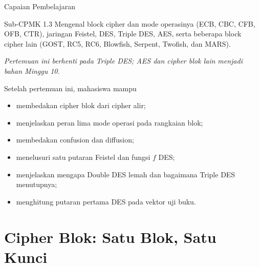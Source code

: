 \documentclass[aspectratio=169,11pt]{beamer}
\begin{document}
\begin{frame}{Capaian Pembelajaran}
    \begin{block}{Sub-CPMK 1.3}
        \footnotesize
        Mengenal block cipher dan mode operasinya (ECB, CBC, CFB, OFB,
        CTR), jaringan Feistel, DES, Triple DES, AES, serta beberapa block
        cipher lain (GOST, RC5, RC6, Blowfish, Serpent, Twofish, dan MARS).
    \end{block}
    \vspace{0.1cm}
    {\scriptsize\itshape Pertemuan ini berhenti pada Triple DES; AES dan
    cipher blok lain menjadi bahan Minggu 10.}
    \vspace{0.15cm}
    \begin{exampleblock}{Setelah pertemuan ini, mahasiswa mampu}
        \footnotesize
        \begin{itemize}
            \item membedakan cipher blok dari cipher alir;
            \item menjelaskan peran lima mode operasi pada rangkaian blok;
            \item membedakan confusion dan diffusion;
            \item menelusuri satu putaran Feistel dan fungsi $f$ DES;
            \item menjelaskan mengapa Double DES lemah dan bagaimana
                  Triple DES menutupnya;
            \item menghitung putaran pertama DES pada vektor uji buku.
        \end{itemize}
    \end{exampleblock}
\end{frame}

\section{Cipher Blok: Satu Blok, Satu Kunci}
\end{document}
